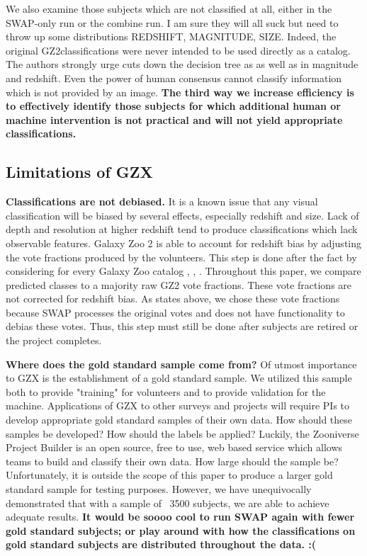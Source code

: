 \documentclass[twocolumn]{aastex6}
\begin{document}
We also examine those subjects which are not classified at all, either in the SWAP-only
run or the combine run. I am sure they will all suck but need to throw up some distributions
REDSHIFT, MAGNITUDE, SIZE.  Indeed, the original GZ2classifications were never intended 
to be used directly as a catalog. The authors strongly urge cuts down the decision tree as
as well as in magnitude and redshift. Even the power of human consensus  cannot 
classify information which is not provided by an image. \textbf{The third way we increase 
efficiency is to effectively identify those subjects for which additional human or 
machine intervention is not practical and will not yield appropriate classifications.} 


\subsection{Limitations of GZX}

\textbf{Classifications are not debiased.}  
It is a known issue that any visual 
classification will be biased by several effects, especially redshift and size. 
Lack of depth and resolution at higher redshift tend to produce classifications 
which lack observable features. Galaxy Zoo 2 is able to account for redshift bias
by adjusting the vote fractions produced by the volunteers. This step is done after
the fact by considering for every Galaxy Zoo catalog
 \cite{Willett2013}, \cite{Willett2016}, \cite{Simmons2016}. 
Throughout this paper, we compare predicted classes to a majority raw GZ2 vote fractions.
These vote fractions are not corrected for redshift bias. As states above, we chose
these vote fractions because SWAP processes the original votes and does not 
have functionality to debias these votes. Thus, this step must still be done 
after subjects are retired or the project completes. 


\textbf{Where does the gold standard sample come from?}
Of utmost importance to GZX is the establishment of a gold standard sample. 
We utilized this sample both to provide "training" for volunteers and to provide 
validation for the machine. Applications of GZX to other surveys and projects will
require PIs to develop appropriate gold standard samples of their own data. 
How should these samples be developed?
How should the labels be applied? Luckily, the Zooniverse Project Builder is an 
open source, free to use, web based service which allows teams to build and classify
their own data.
 How large should the sample be?  Unfortunately, it is outside the scope of this paper
to produce a larger gold standard sample for testing purposes. However, we have 
unequivocally demonstrated that with a sample of ~3500 subjects, we are able to 
achieve adequate results. 
\textbf{It would be soooo cool to run SWAP again with fewer gold standard subjects; 
or play around with how the classifications on gold standard subjects are distributed throughout the data. :(}
\end{document}
